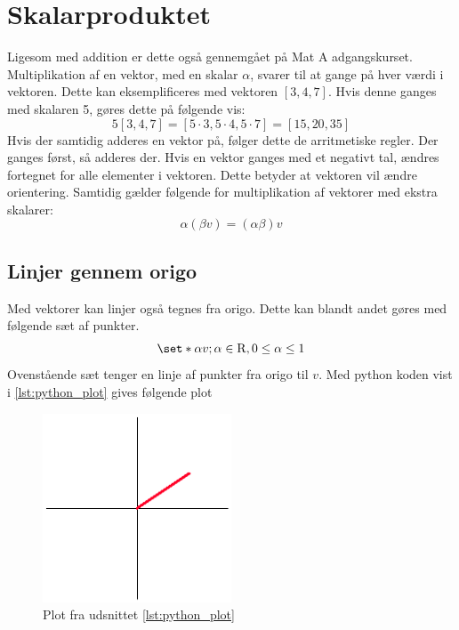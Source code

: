 \section{Skalarproduktet}\label{sec:scalar}
Ligesom med addition er dette også gennemgået på Mat A adgangskurset.
Multiplikation af en vektor, med en skalar $\alpha$, svarer til at gange på hver værdi i vektoren.
Dette kan eksemplificeres med vektoren $[3,4,7]$.
Hvis denne ganges med skalaren 5, gøres dette på følgende vis:
\begin{equation}
	\label{eqn:scalar}
	5[3,4,7] = [5\cdot3,5\cdot4,5\cdot7] = [15,20,35]
\end{equation}
Hvis der samtidig adderes en vektor på, følger dette de arritmetiske regler. 
Der ganges først, så adderes der.
Hvis en vektor ganges med et negativt tal, ændres fortegnet for alle elementer i vektoren.
Dette betyder at vektoren vil ændre orientering.
Samtidig gælder følgende for multiplikation af vektorer med ekstra skalarer:
\begin{equation}
	\label{eqn:scalar_mult}
	\alpha(\beta v)=(\alpha\beta)v
\end{equation}

\subsection{Linjer gennem origo}\label{ssec:lto}
Med vektorer kan linjer også tegnes fra origo.
Dette kan blandt andet gøres med følgende sæt af punkter.
\begin{equation}
	\label{eqn:origo}
	\set*{\alpha v; \alpha\in\mathrm{R},0\leq\alpha\leq1}
\end{equation}
Ovenstående sæt tenger en linje af punkter fra origo til $v$.
Med python koden vist i \cref{lst:python_plot} gives følgende plot
\begin{figure}[h]
	\centering
	\includegraphics[width=0.5\textwidth]{img/vecplot.png}
	\caption{Plot fra udsnittet \cref{lst:python_plot}}
	\label{fig:plot_line}
\end{figure}


